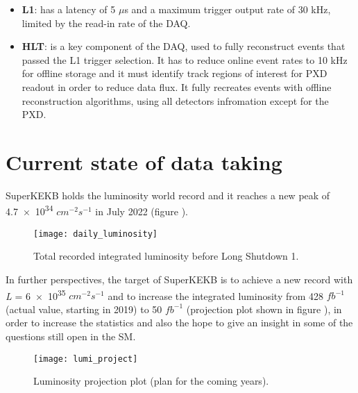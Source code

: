 \begin{itemize}
\item \textbf{L1}: has a latency of 5 $\mu$s and a maximum trigger output rate of 30 kHz, limited by the read-in rate of the DAQ.
\item \textbf{HLT}: is a key component of the DAQ, used to fully reconstruct events that passed the L1 trigger selection. It has to reduce online event rates to 10 kHz for offline storage and it must identify track regions of interest for PXD readout in order to reduce data flux. It fully recreates events with offline reconstruction algorithms, using all detectors infromation except for the PXD.
\end{itemize}


\begin{comment}
\begin{figure}
\centering
\texttt{[image: detector\_summary]}
\caption{}
\label{}
\end{figure}
\end{comment}


\section{Current state of data taking} \label{perspectives}

SuperKEKB holds the luminosity world record and it reaches a new peak of \num{4.7e34} $cm^{-2}s^{-1}$ in July 2022 (figure ).

\begin{figure}[h!]
\centering
\texttt{[image: daily\_luminosity]}
\caption{Total recorded integrated luminosity before Long Shutdown 1.}
\label{fig:total_luminosity}
\end{figure}

In further perspectives, the target of SuperKEKB is to achieve a new record with \textit{L} = \num{6e35} $cm^{-2}s^{-1}$ and to increase the integrated luminosity from 428 $fb^{-1}$ (actual value, starting in 2019) to 50 $fb^{-1}$ (projection plot shown in figure ), in order to increase the statistics and also the hope to give an insight in some of the questions still open in the SM.\\

\begin{figure}
\centering
\texttt{[image: lumi\_project]}
\caption{Luminosity projection plot (plan for the coming years).}
\label{lumy_projection}
\end{figure}

